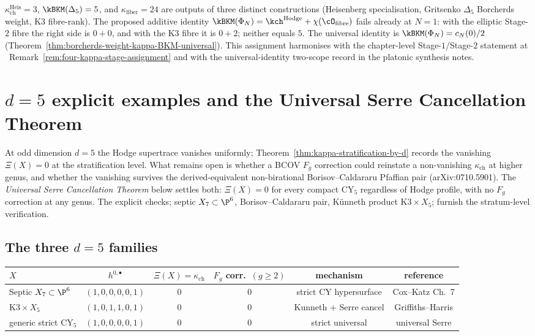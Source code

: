 \begin{remark}
\(\kappa_{\mathrm{ch}}^{\mathrm{Heis}}=3\), $\kBKM(\Delta_5) = 5$, and
$\kappa_{\mathrm{fiber}} = 24$ are
outputs of three distinct constructions
(Heisenberg specialisation, Gritsenko $\Delta_5$ Borcherds
weight, K3 fibre-rank). The proposed additive identity
$\kBKM(\Phi_N) = \kch^{\mathrm{Hodge}} + \chi(\cO_{\mathrm{fibre}})$ fails already at \(N=1\):
with the elliptic Stage-$2$ fibre the right side is \(0+0\), and with
the K3 fibre it is \(0+2\); neither equals \(5\). The universal identity
is $\kBKM(\Phi_N) = c_N(0)/2$
(Theorem~\ref{thm:borcherds-weight-kappa-BKM-universal}). This
assignment harmonises with the chapter-level Stage-$1$/Stage-$2$
statement at
\cite{VolI}~Remark~\ref{rem:four-kappa-stage-assignment}
and with the universal-identity two-scope record in the platonic
synthesis notes.
\end{remark}

\section{\texorpdfstring{$d = 5$}{d = 5} explicit examples and the Universal Serre Cancellation Theorem}
\label{sec:cy-strat-d5-explicit}

At odd dimension $d = 5$ the Hodge supertrace vanishes uniformly;
Theorem~\ref{thm:kappa-stratification-by-d} records the vanishing
$\Xi(X) = 0$ at the stratification level. What remains open is
whether a BCOV $F_g$ correction could reinstate a non-vanishing
$\kappa_{\mathrm{ch}}$ at higher genus, and whether the vanishing
survives the derived-equivalent non-birational Borisov--Caldararu
Pfaffian pair (arXiv:0710.5901). The \emph{Universal Serre Cancellation
Theorem} below settles both: $\Xi(X) = 0$ for every compact CY$_5$
regardless of Hodge profile, with no $F_g$ correction at any genus.
The explicit checks; septic $X_7 \subset \P^6$, Borisov--Caldararu
pair, K\"unneth product $\mathrm{K3} \times X_5$; furnish the
stratum-level verification.

\subsection{The three \texorpdfstring{$d = 5$}{d = 5} families}
\label{subsec:cy-strat-d5-families}

\begin{center}
\begin{tabular}{lccccc}
\toprule
$X$ & $h^{0,\bullet}$ & $\Xi(X) = \kappa_{\mathrm{ch}}$ & $F_g$ corr.~$(g \geq 2)$ &
mechanism & reference \\
\midrule
Septic $X_7 \subset \P^6$ & $(1,0,0,0,0,1)$ & $0$ & $0$ & strict CY hypersurface &
Cox--Katz Ch.~7 \\
$\mathrm{K3} \times X_5$ & $(1,0,1,1,0,1)$ & $0$ & $0$ & Kunneth + Serre cancel &
Griffiths--Harris \\
generic strict CY$_5$ & $(1,0,0,0,0,1)$ & $0$ & $0$ & strict universal &
universal Serre \\
\bottomrule
\end{tabular}
\end{center}

